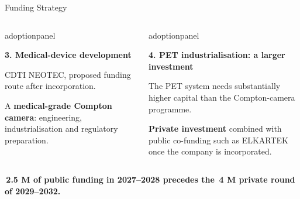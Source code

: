 \documentclass[aspectratio=169,11pt]{beamer}
\begin{document}
\begin{frame}{Funding Strategy}
\begin{columns}[T,onlytextwidth]
\begin{beamercolorbox}[sep=6pt,wd=\linewidth]{adoptionpanel}
\begin{minipage}[t][2.0cm][t]{\linewidth}
{\footnotesize\bfseries\color{crBlue}3. Medical-device development\par}
\vspace{0.07cm}
{\scriptsize CDTI NEOTEC, proposed funding route after incorporation.\par\vspace{0.06cm}
A \textbf{medical-grade Compton camera}: engineering, industrialisation and regulatory preparation.\par}
\end{minipage}
\end{beamercolorbox}
\begin{beamercolorbox}[sep=6pt,wd=\linewidth]{adoptionpanel}
\begin{minipage}[t][2.0cm][t]{\linewidth}\raggedright
{\footnotesize\bfseries\color{crBlue}4. PET industrialisation: a larger investment\par}
\vspace{0.07cm}
{\scriptsize The PET system needs substantially higher capital than the Compton-camera programme.\par\vspace{0.06cm}
\textbf{Private investment} combined with public co-funding such as ELKARTEK once the company is incorporated.\par}
\end{minipage}
\end{beamercolorbox}
\end{columns}
\vspace{0.14cm}
{\footnotesize\bfseries\color{darkred}\EUR\,2.5 M of public funding in 2027--2028 precedes the \EUR\,4 M private round of 2029--2032.\par}
\end{frame}


\end{document}
